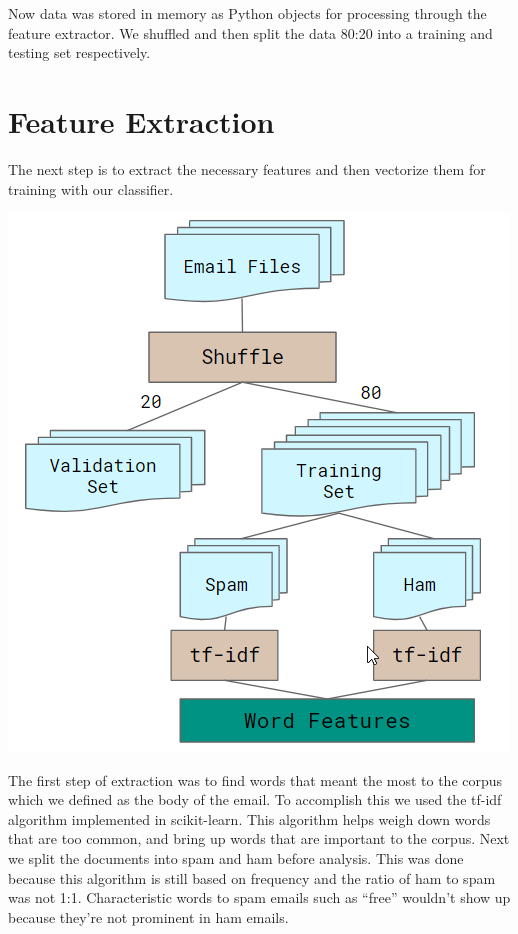 \documentclass[12pt]{article}
\newenvironment{Figure}
  {\par\medskip\noindent\minipage{\linewidth}}
  {\endminipage\par\medskip}
\begin{document}
\begin{multicols}{2}
            Now data was stored in memory as Python objects for processing through the
            feature extractor. We shuffled and then split the data 
            80:20 into a training and testing set respectively.
        
        \section{Feature Extraction}

            The next step is to extract the necessary features and then vectorize
            them for training with our classifier. 
            
            \begin{Figure}
                \centering
                \includegraphics[scale=0.5]{figures/extract.png}
                \label{fig:extrac}
            \end{Figure}
            
            
            The first step of extraction was
            to find words that meant the most to the corpus which we defined as
            the body of the email. To accomplish this
            we used the tf-idf algorithm implemented in scikit-learn. This algorithm helps
            weigh down words that are too common, and bring up words that are important
            to the corpus. Next we split the documents into spam and ham before analysis.
            This was done because this algorithm is still based on frequency and the
            ratio of ham to spam was not 1:1. Characteristic words to spam emails such
            as ``free'' wouldn't show up because they're not prominent in ham emails.


\end{multicols}
\end{document}
